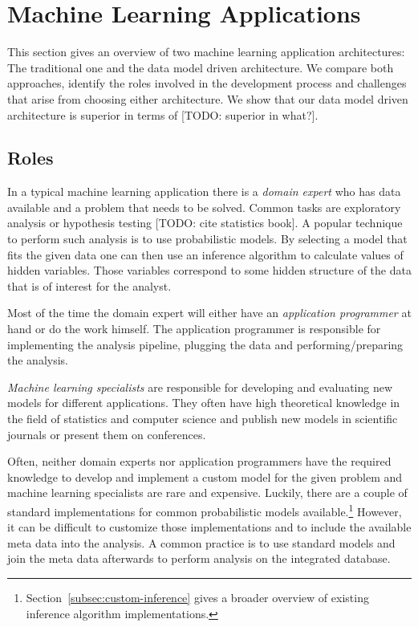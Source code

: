 \section{Machine Learning Applications}

This section gives an overview of two machine learning application architectures: The traditional one and the data model driven architecture. We compare both approaches, identify the roles involved in the development process and challenges that arise from choosing either architecture. We show that our data model driven architecture is superior in terms of [TODO: superior in what?].

\subsection{Roles}

In a typical machine learning application there is a \emph{domain expert} who has data available and a problem that needs to be solved. Common tasks are exploratory analysis or hypothesis testing [TODO: cite statistics book]. A popular technique to perform such analysis is to use probabilistic models. By selecting a model that fits the given data one can then use an inference algorithm to calculate values of hidden variables. Those variables correspond to some hidden structure of the data that is of interest for the analyst.

Most of the time the domain expert will either have an \emph{application programmer} at hand or do the work himself. The application programmer is responsible for implementing the analysis pipeline, plugging the data and performing/preparing the analysis.

\emph{Machine learning specialists} are responsible for developing and evaluating new models for different applications. They often have high theoretical knowledge in the field of statistics and computer science and publish new models in scientific journals or present them on conferences.

Often, neither domain experts nor application programmers have the required knowledge to develop and implement a custom model for the given problem and machine learning specialists are rare and expensive. Luckily, there are a couple of standard implementations for common probabilistic models available.\footnote{Section~\ref{subsec:custom-inference} gives a broader overview of existing inference algorithm implementations.} However, it can be difficult to customize those implementations and to include the available meta data into the analysis. A common practice is to use standard models and join the meta data afterwards to perform analysis on the integrated database.

